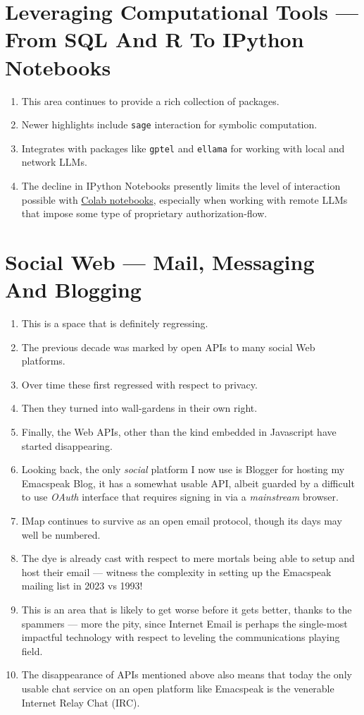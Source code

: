 \documentclass[11pt]{article}
\begin{document}
\section{Leveraging Computational Tools —  From SQL And R To IPython Notebooks}
\label{sec:org3b51318}

\begin{enumerate}
\item This area continues to provide a rich collection of  packages.
\item Newer highlights include \texttt{sage} interaction for symbolic computation.
\item Integrates with packages like \texttt{gptel} and \texttt{ellama} for working
with local and network LLMs.
\item The decline in IPython Notebooks presently limits
the level of interaction possible with \href{https://colab.research.google.com/}{Colab notebooks},
especially when working with remote LLMs that impose some type of
proprietary authorization-flow.
\end{enumerate}
\section{Social Web  — Mail, Messaging And Blogging}
\label{sec:org527a60a}

\begin{enumerate}
\item This is a space that is definitely regressing.
\item The previous decade was marked by open APIs to many social Web platforms.
\item Over time these first regressed with respect to privacy.
\item Then they turned into wall-gardens in their own right.
\item Finally, the Web APIs, other than the kind embedded in Javascript have
started disappearing.
\item Looking back, the only \emph{social} platform I now use is Blogger for
hosting my Emacspeak Blog, it has a somewhat usable API, albeit
guarded by a difficult to use \emph{OAuth} interface that requires 
signing   in via  a \emph{mainstream} browser.
\item IMap continues to survive as an open email protocol, though its
days may well be numbered.
\item The dye is already cast with respect to mere mortals being able
to setup and  host their email ---  witness the complexity in setting
up the Emacspeak mailing list in 2023 vs 1993!
\item This is an area that is  likely to get worse before it gets
better,  thanks to the spammers  --- more the pity, since Internet Email is perhaps the
single-most impactful technology with respect to leveling the
communications playing field.
\item The disappearance of APIs mentioned above also means that today
the only usable chat service on an open platform like Emacspeak
is the venerable  Internet Relay Chat (IRC).
\end{enumerate}
\end{document}
